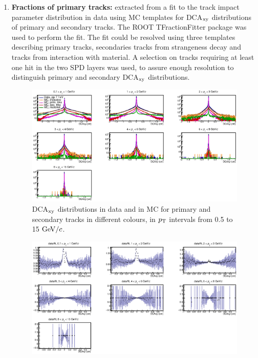 \begin{enumerate}
\item {\bf Fractions of primary tracks:} extracted from a fit to
 the track impact parameter distribution in data using MC templates for 
 DCA$_{\rm xy}$ distributions of primary and secondary tracks. The ROOT TFractionFitter 
 package was used to perform the fit. The fit could be resolved 
 using three templates describing primary tracks, secondaries tracks
 from strangeness decay and tracks from interaction with material. 
 A selection on tracks requiring at least one hit in the two SPD layers 
 was used, to assure enough resolution to distinguish primary and 
 secondary DCA$_{\rm xy}$ distributions.
\begin{figure}[!htb]
\begin{center}
\includegraphics[width=.99\textwidth]{FigCap4/FitComponents.eps}
\caption{DCA$_{\rm xy}$ distributions in data and in MC for primary and secondary tracks in different colours, in $p_{\rm T}$ intervals from 0.5 to 15 $\mathrm{GeV}/c$.}
\label{fig:DCAxyDataMCVsPt}
\end{center}
\end{figure}
\begin{figure}[!hb]
\begin{center}
\includegraphics[width=.99\textwidth]{FigCap4/DataOverFit.eps}

\end{center}
\end{figure}
\end{enumerate}

